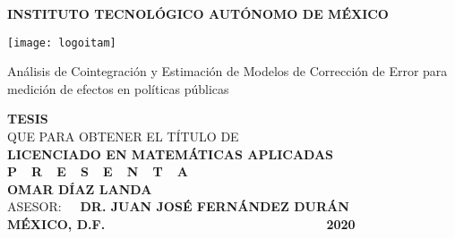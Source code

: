 \begin{titlepage}
    \begin{center}
        
        \vspace{0.2cm}

        \large
        \textbf{INSTITUTO TECNOL\'OGICO AUT\'ONOMO DE M\'EXICO}

        \vspace{1.2cm}
        
        \texttt{[image: logoitam]}
        
        \vspace{0.8cm}
        \LARGE
        Análisis de Cointegración y Estimación de Modelos de Corrección de Error para medición de efectos en políticas públicas
        
        \vspace{1.1cm}
        
        \normalsize \textbf{TESIS}\\ QUE PARA OBTENER EL T\'ITULO DE\\ \textbf{LICENCIADO EN MATEM\'ATICAS APLICADAS}\\[0.8cm]
        \normalsize \textbf{P\ \  R\ \  E\ \  S\ \  E\ \  N\ \  T\ \  A}\\[0.8cm]

        \textbf{OMAR D\'IAZ LANDA}\\[1.0cm]

        \normalsize ASESOR: \textbf{\ \ DR. JUAN JOSÉ FERN\'ANDEZ DUR\'AN}\\[1.0cm]

        \normalsize \textbf{M\'EXICO, D.F.} {\ \ \ \ \ \ \ \ \ \ \ \ \ \ \ \ \ \ \ \ \ \ \ \ \ \ \ \ \ \ \ \ \ \ } \textbf{2020}
    \end{center}
\end{titlepage}